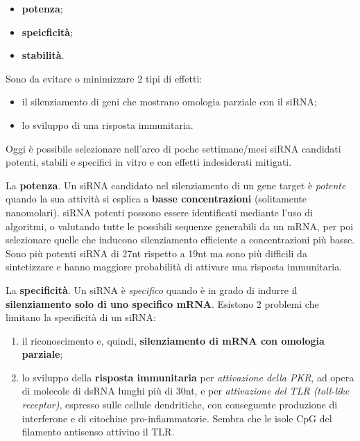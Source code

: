 \documentclass[]{article}
\begin{document}
\begin{itemize}
\itemsep1pt\parskip0pt
\item
  \textbf{potenza};
\item
  \textbf{speicficità};
\item
  \textbf{stabilità}.
\end{itemize}

Sono da evitare o minimizzare 2 tipi di effetti:

\begin{itemize}
\itemsep1pt\parskip0pt
\item
  il silenziamento di geni che mostrano omologia parziale con il siRNA;
\item
  lo sviluppo di una risposta immunitaria.
\end{itemize}

Oggi è possibile selezionare nell'arco di poche settimane/mesi siRNA
candidati potenti, stabili e specifici in vitro e con effetti
indesiderati mitigati.

La \textbf{potenza}. Un siRNA candidato nel silenziamento di un gene
target è \emph{potente} quando la sua attività si esplica a
\textbf{basse concentrazioni} (solitamente nanomolari). siRNA potenti
possono essere identificati mediante l'uso di algoritmi, o valutando
tutte le possibili sequenze generabili da un mRNA, per poi selezionare
quelle che inducono silenziamento efficiente a concentrazioni più basse.
Sono più potenti siRNA di 27nt rispetto a 19nt ma sono più difficili da
sintetizzare e hanno maggiore probabilità di attivare una risposta
immunitaria.

La \textbf{specificità}. Un siRNA è \emph{specifico} quando è in grado
di indurre il \textbf{silenziamento solo di uno specifico mRNA}.
Esistono 2 problemi che limitano la specificità di un siRNA:

\begin{enumerate}
\def\labelenumi{\arabic{enumi}.}
\itemsep1pt\parskip0pt
\item
  il riconoscimento e, quindi, \textbf{silenziamento di mRNA con
  omologia parziale};
\item
  lo sviluppo della \textbf{risposta immunitaria} per \emph{attivazione
  della PKR}, ad opera di molecole di dsRNA lunghi più di 30nt, e per
  \emph{attivazione del TLR (toll-like receptor)}, espresso sulle
  cellule dendritiche, con conseguente produzione di interferone e di
  citochine pro-infiammatorie. Sembra che le isole CpG del filamento
  antisenso attivino il TLR.
\end{enumerate}
\end{document}
